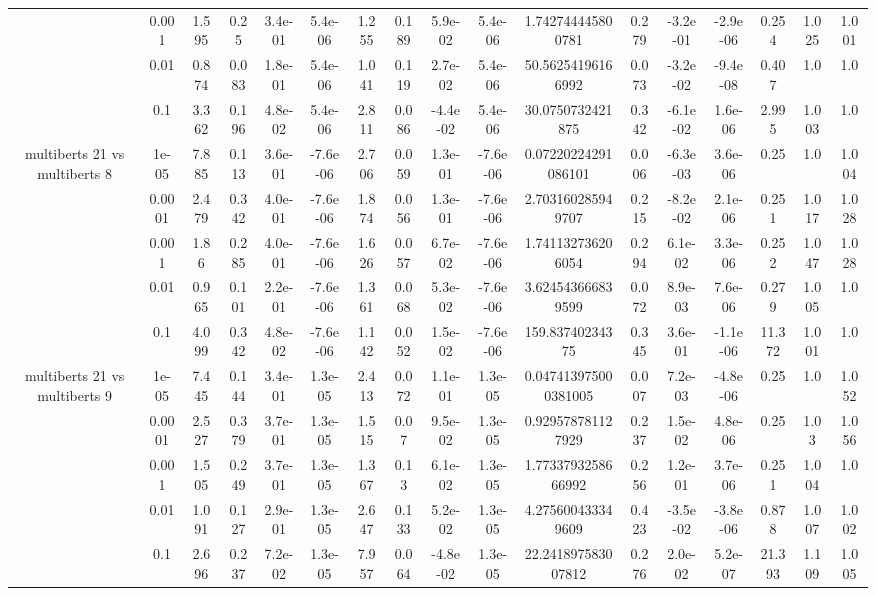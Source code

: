 \begin{tabular}{|c|c|c|c|c|c|c|c|c|c|c|c|c|c|c|c|c|}
 & 0.001 & 1.595 & 0.25 & 3.4e-01 & 5.4e-06 & 1.255 & 0.189 & 5.9e-02 & 5.4e-06 & 1.742744445800781 & 0.279 & -3.2e-01 & -2.9e-06 & 0.254 & 1.025 & 1.001 \\
 & 0.01 & 0.874 & 0.083 & 1.8e-01 & 5.4e-06 & 1.041 & 0.119 & 2.7e-02 & 5.4e-06 & 50.56254196166992 & 0.073 & -3.2e-02 & -9.4e-08 & 0.407 & 1.0 & 1.0 \\
 & 0.1 & 3.362 & 0.196 & 4.8e-02 & 5.4e-06 & 2.811 & 0.086 & -4.4e-02 & 5.4e-06 & 30.0750732421875 & 0.342 & -6.1e-02 & 1.6e-06 & 2.995 & 1.003 & 1.0 \\
\hline
\multirow{5}{*}{multiberts 21 vs multiberts 8} & 1e-05 & 7.885 & 0.113 & 3.6e-01 & -7.6e-06 & 2.706 & 0.059 & 1.3e-01 & -7.6e-06 & 0.07220224291086101 & 0.006 & -6.3e-03 & 3.6e-06 & 0.25 & 1.0 & 1.004 \\
 & 0.0001 & 2.479 & 0.342 & 4.0e-01 & -7.6e-06 & 1.874 & 0.056 & 1.3e-01 & -7.6e-06 & 2.703160285949707 & 0.215 & -8.2e-02 & 2.1e-06 & 0.251 & 1.017 & 1.028 \\
 & 0.001 & 1.86 & 0.285 & 4.0e-01 & -7.6e-06 & 1.626 & 0.057 & 6.7e-02 & -7.6e-06 & 1.741132736206054 & 0.294 & 6.1e-02 & 3.3e-06 & 0.252 & 1.047 & 1.028 \\
 & 0.01 & 0.965 & 0.101 & 2.2e-01 & -7.6e-06 & 1.361 & 0.068 & 5.3e-02 & -7.6e-06 & 3.624543666839599 & 0.072 & 8.9e-03 & 7.6e-06 & 0.279 & 1.005 & 1.0 \\
 & 0.1 & 4.099 & 0.342 & 4.8e-02 & -7.6e-06 & 1.142 & 0.052 & 1.5e-02 & -7.6e-06 & 159.83740234375 & 0.345 & 3.6e-01 & -1.1e-06 & 11.372 & 1.001 & 1.0 \\
\hline
\multirow{5}{*}{multiberts 21 vs multiberts 9} & 1e-05 & 7.445 & 0.144 & 3.4e-01 & 1.3e-05 & 2.413 & 0.072 & 1.1e-01 & 1.3e-05 & 0.047413975000381005 & 0.007 & 7.2e-03 & -4.8e-06 & 0.25 & 1.0 & 1.052 \\
 & 0.0001 & 2.527 & 0.379 & 3.7e-01 & 1.3e-05 & 1.515 & 0.07 & 9.5e-02 & 1.3e-05 & 0.929578781127929 & 0.237 & 1.5e-02 & 4.8e-06 & 0.25 & 1.03 & 1.056 \\
 & 0.001 & 1.505 & 0.249 & 3.7e-01 & 1.3e-05 & 1.367 & 0.13 & 6.1e-02 & 1.3e-05 & 1.7733793258666992 & 0.256 & 1.2e-01 & 3.7e-06 & 0.251 & 1.004 & 1.0 \\
 & 0.01 & 1.091 & 0.127 & 2.9e-01 & 1.3e-05 & 2.647 & 0.133 & 5.2e-02 & 1.3e-05 & 4.275600433349609 & 0.423 & -3.5e-02 & -3.8e-06 & 0.878 & 1.007 & 1.002 \\
 & 0.1 & 2.696 & 0.237 & 7.2e-02 & 1.3e-05 & 7.957 & 0.064 & -4.8e-02 & 1.3e-05 & 22.241897583007812 & 0.276 & 2.0e-02 & 5.2e-07 & 21.393 & 1.109 & 1.005 \\

\end{tabular}

